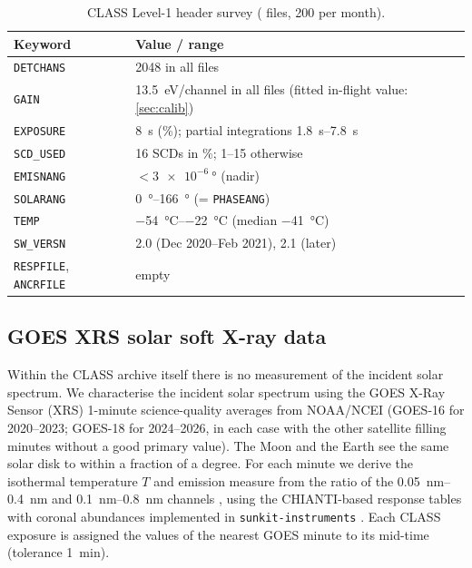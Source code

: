 \begin{table}[!tp]
\centering
\small
\caption{CLASS Level-1 header survey (\NHeaderSample{} files, 200 per month).}\label{tab:headers}
\begin{tabular}{ll}
\toprule
Keyword & Value / range \\
\midrule
\texttt{DETCHANS} & 2048 in all files \\
\texttt{GAIN} & \SI{13.5}{eV/channel} in all files (fitted in-flight value: \cref{sec:calib}) \\
\texttt{EXPOSURE} & \SI{8}{s} (\PctFullExp{}\%); partial integrations \SIrange{1.8}{7.8}{s} \\
\texttt{SCD\_USED} & 16 SCDs in \PctAllSCD{}\%; 1--15 otherwise \\
\texttt{EMISNANG} & $<\SI{3e-6}{\degree}$ (nadir) \\
\texttt{SOLARANG} & \SIrange{0}{166}{\degree} (= \texttt{PHASEANG}) \\
\texttt{TEMP} & \SIrange{-54}{-22}{\celsius} (median \SI{-41}{\celsius}) \\
\texttt{SW\_VERSN} & 2.0 (Dec 2020--Feb 2021), 2.1 (later) \\
\texttt{RESPFILE}, \texttt{ANCRFILE} & empty \\
\bottomrule
\end{tabular}
\end{table}

\subsection{GOES XRS solar soft X-ray data}\label{sec:goes}
Within the CLASS archive itself there is no measurement of the incident solar spectrum. We characterise the incident solar spectrum using the GOES X-Ray Sensor (XRS) 1-minute science-quality averages from NOAA/NCEI (GOES-16 for 2020--2023; GOES-18 for 2024--2026, in each case with the other satellite filling minutes without a good primary value). The Moon and the Earth see the same solar disk to within a fraction of a degree. For each minute we derive the isothermal temperature $T$ and emission measure from the ratio of the \SIrange{0.05}{0.4}{nm} and \SIrange{0.1}{0.8}{nm} channels \citep{White2005}, using the CHIANTI-based response tables with coronal abundances implemented in \texttt{sunkit-instruments} \citep{SunPy2020}. Each CLASS exposure is assigned the values of the nearest GOES minute to its mid-time (tolerance \SI{1}{min}).

